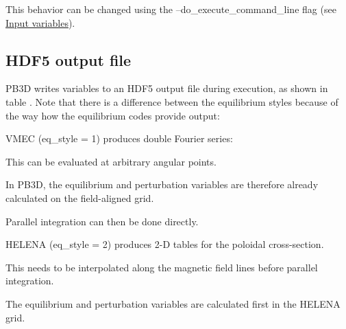This behavior can be changed using the {\ttfamily --do\+\_\+execute\+\_\+command\+\_\+line} flag (see \hyperlink{page_inputs}{Input variables}).\hypertarget{page_outputs_output_file_HDF5}{}\subsection{H\+D\+F5 output file}\label{page_outputs_output_file_HDF5}
P\+B3D writes variables to an H\+D\+F5 output file during execution, as shown in table . Note that there is a difference between the equilibrium styles because of the way how the equilibrium codes provide output\+:
\begin{DoxyItemize}
\item V\+M\+EC ({\ttfamily eq\+\_\+style = 1}) produces double Fourier series\+:
\begin{DoxyItemize}
\item This can be evaluated at arbitrary angular points.
\item In P\+B3D, the equilibrium and perturbation variables are therefore already calculated on the field-\/aligned grid.
\item Parallel integration can then be done directly.
\end{DoxyItemize}
\item H\+E\+L\+E\+NA ({\ttfamily eq\+\_\+style = 2}) produces 2-\/D tables for the poloidal cross-\/section.
\begin{DoxyItemize}
\item This needs to be interpolated along the magnetic field lines before parallel integration.
\item The equilibrium and perturbation variables are calculated first in the H\+E\+L\+E\+NA grid.
\end{DoxyItemize}
\end{DoxyItemize}

